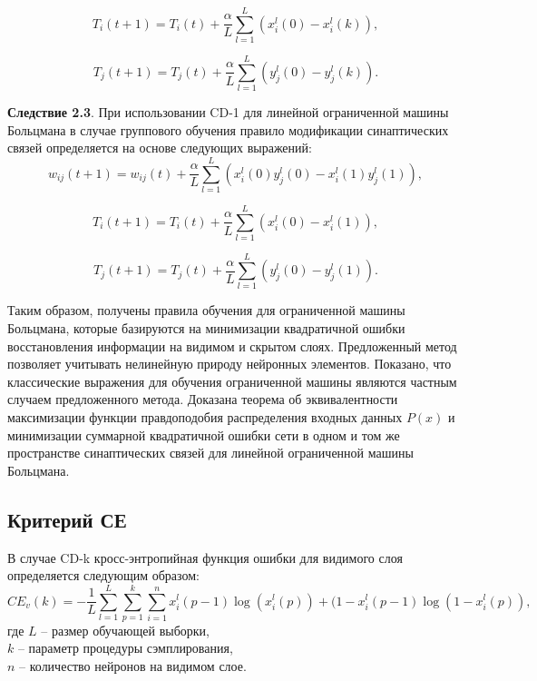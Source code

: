\begin{equation*}
    T_{i}(t+1)=T_{i}(t)+\frac{\alpha}{L}\sum_{l=1}^L (x_i^l(0)-x_i^l(k)),
\end{equation*}

\begin{equation*}
    T_{j}(t+1)=T_{j}(t)+\frac{\alpha}{L}\sum_{l=1}^L (y_j^l(0)-y_j^l(k)).
\end{equation*}

\textbf{Следствие 2.3}. При использовании  CD-1 для линейной ограниченной машины Больцмана в случае группового обучения правило модификации синаптических связей определяется на основе следующих выражений:
\begin{equation*}
    w_{ij}(t+1)=w_{ij}(t)+\frac{\alpha}{L}\sum_{l=1}^L (x_i^l(0)y_j^l(0)-x_i^l(1)y_j^l(1)),
\end{equation*}

\begin{equation*}
    T_{i}(t+1)=T_{i}(t)+\frac{\alpha}{L}\sum_{l=1}^L (x_i^l(0)-x_i^l(1)),
\end{equation*}

\begin{equation*}
    T_{j}(t+1)=T_{j}(t)+\frac{\alpha}{L}\sum_{l=1}^L (y_j^l(0)-y_j^l(1)).
\end{equation*}

Таким образом, получены правила обучения для ограниченной машины Больцмана, которые базируются на минимизации квадратичной ошибки восстановления информации на видимом и скрытом слоях.  Предложенный метод позволяет учитывать нелинейную природу нейронных элементов. Показано, что классические выражения для обучения ограниченной машины являются частным случаем предложенного метода. Доказана теорема об эквивалентности максимизации функции правдоподобия распределения входных данных $P(x)$ и минимизации суммарной квадратичной ошибки сети в одном и том же пространстве синаптических связей для линейной ограниченной машины Больцмана. 

\subsection{Критерий СЕ}

В случае CD-k кросс-энтропийная функция ошибки для видимого слоя определяется следующим образом:
\begin{equation*}
	CE_v(k) = -\frac{1}{L}\sum_{l=1}^L \sum_{p=1}^k \sum_{i=1}^n x_i^l(p-1)\log(x_i^l(p))+(1-x_i^l(p-1)\log(1-x_i^l(p)),
\end{equation*}
где $L$ -- размер обучающей выборки,\\
$k$ -- параметр процедуры сэмплирования,\\
$n$ -- количество нейронов на видимом слое.

